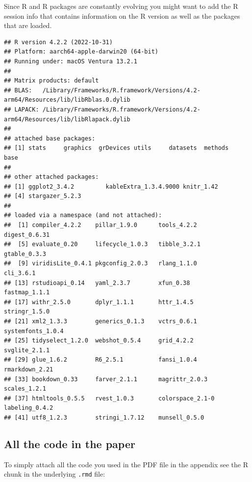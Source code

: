 \documentclass[
  12pt,
]{article}
\begin{document}
Since R and R packages are constantly evolving you might want to add the R session info that contains information on the R version as well as the packages that are loaded.

\begin{verbatim}
## R version 4.2.2 (2022-10-31)
## Platform: aarch64-apple-darwin20 (64-bit)
## Running under: macOS Ventura 13.2.1
## 
## Matrix products: default
## BLAS:   /Library/Frameworks/R.framework/Versions/4.2-arm64/Resources/lib/libRblas.0.dylib
## LAPACK: /Library/Frameworks/R.framework/Versions/4.2-arm64/Resources/lib/libRlapack.dylib
## 
## attached base packages:
## [1] stats     graphics  grDevices utils     datasets  methods   base     
## 
## other attached packages:
## [1] ggplot2_3.4.2         kableExtra_1.3.4.9000 knitr_1.42           
## [4] stargazer_5.2.3      
## 
## loaded via a namespace (and not attached):
##  [1] compiler_4.2.2    pillar_1.9.0      tools_4.2.2       digest_0.6.31    
##  [5] evaluate_0.20     lifecycle_1.0.3   tibble_3.2.1      gtable_0.3.3     
##  [9] viridisLite_0.4.1 pkgconfig_2.0.3   rlang_1.1.0       cli_3.6.1        
## [13] rstudioapi_0.14   yaml_2.3.7        xfun_0.38         fastmap_1.1.1    
## [17] withr_2.5.0       dplyr_1.1.1       httr_1.4.5        stringr_1.5.0    
## [21] xml2_1.3.3        generics_0.1.3    vctrs_0.6.1       systemfonts_1.0.4
## [25] tidyselect_1.2.0  webshot_0.5.4     grid_4.2.2        svglite_2.1.1    
## [29] glue_1.6.2        R6_2.5.1          fansi_1.0.4       rmarkdown_2.21   
## [33] bookdown_0.33     farver_2.1.1      magrittr_2.0.3    scales_1.2.1     
## [37] htmltools_0.5.5   rvest_1.0.3       colorspace_2.1-0  labeling_0.4.2   
## [41] utf8_1.2.3        stringi_1.7.12    munsell_0.5.0
\end{verbatim}

\hypertarget{all-the-code-in-the-paper}{%
\subsection{All the code in the paper}\label{all-the-code-in-the-paper}}

To simply attach all the code you used in the PDF file in the appendix see the R chunk in the underlying \texttt{.rmd} file:
\end{document}
